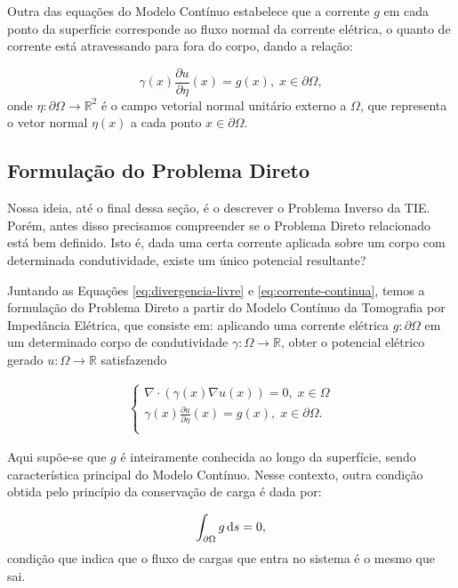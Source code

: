 Outra das equações do Modelo Contínuo estabelece que a corrente $g$ em cada ponto da superfície corresponde ao fluxo normal da corrente elétrica, o quanto de corrente está atravessando para fora do corpo, dando a relação:

\begin{equation}\label{eq:corrente-continua}
\gamma(x) \frac{\partial u}{\partial \eta}(x) = g(x), \; x \in \partial \Omega,
\end{equation}
onde $\eta: \partial \Omega \to \mathbb R^2$ é o campo vetorial normal unitário externo a $\Omega$, que representa o vetor normal $\eta(x)$ a cada ponto $x \in \partial \Omega$. 

\subsection{Formulação do Problema Direto}

Nossa ideia, até o final dessa seção, é o descrever o Problema Inverso da TIE. Porém, antes disso precisamos compreender se o Problema Direto relacionado está bem definido. Isto é, dada uma certa corrente aplicada sobre um corpo com determinada condutividade, existe um único potencial resultante?  

Juntando as Equações \eqref{eq:divergencia-livre} e \eqref{eq:corrente-continua}, temos a formulação do Problema Direto a partir do Modelo Contínuo da Tomografia por Impedância Elétrica, que consiste em: aplicando uma corrente elétrica $g : \partial \Omega$ em um determinado corpo de condutividade $\gamma : \Omega \to \mathbb R$, obter o potencial elétrico gerado $u: \Omega \to \mathbb R$ satisfazendo

\begin{align}\label{eq:modelo-continuo}
\begin{cases}
\nabla \cdot (\gamma(x) \nabla u(x)) = 0, \; x\in \Omega \\
\gamma(x) \frac{\partial u}{\partial \eta}(x) = g(x), \; x \in \partial \Omega. \\
\end{cases}
\end{align}

Aqui supõe-se que $g$ é inteiramente conhecida ao longo da superfície, sendo característica principal do Modelo Contínuo. Nesse contexto, outra condição obtida pelo princípio da conservação de carga é dada por:

\begin{equation}\label{eq:conservacao-carga-continuo}
\int_{\partial \Omega} g \mathop{}\!\mathrm{d} s = 0,
\end{equation}
condição que indica que o fluxo de cargas que entra no sistema é o mesmo que sai. 

